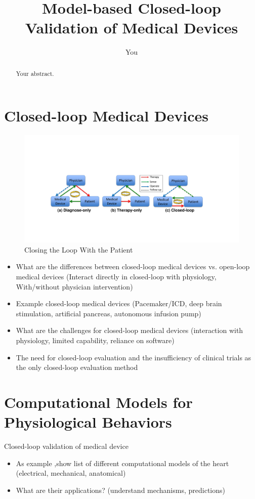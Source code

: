 \documentclass[a4paper]{article}
\title{Model-based Closed-loop Validation of Medical Devices}
\author{You}
\begin{document}
\maketitle

\begin{abstract}
Your abstract.
\end{abstract}

\section{Closed-loop Medical Devices}
\begin{figure}[t]
		\centering
		\includegraphics[width=\textwidth]{figs/closed-loop.pdf}
		\caption{\small Closing the Loop With the Patient}
		\label{fig:closed-loop}
\end{figure}
\begin{itemize}
	\item What are the differences between closed-loop medical devices vs. open-loop medical devices (Interact directly in closed-loop with physiology, With/without physician intervention)
	\item Example closed-loop medical devices (Pacemaker/ICD, deep brain stimulation, artificial pancreas, autonomous infusion pump)
	\item What are the challenges for closed-loop medical devices (interaction with physiology, limited capability, reliance on software)
	\item The need for closed-loop evaluation and the insufficiency of clinical trials as the only closed-loop evaluation method
\end{itemize}

\section{Computational Models for Physiological Behaviors}
Closed-loop validation of medical device
\begin{itemize}
	\item As example ,show list of different computational models of the heart (electrical, mechanical, anatomical)
	\item What are their applications? (understand mechanisms, predictions)
\end{itemize}
\end{document}
